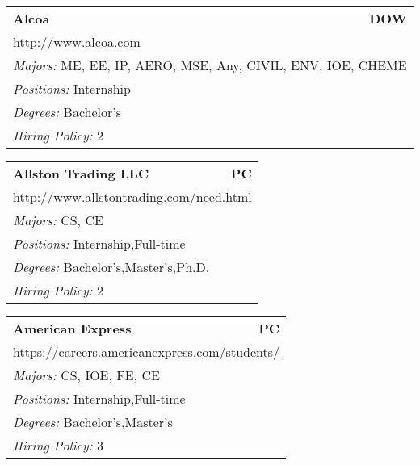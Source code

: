\documentclass[twoside]{article}
\begin{document}
\begin{center}
\begin{multicols}{3}
\begin{FlushLeft}
\begin{minipage}{.9\columnwidth}
\end{minipage}
 
\begin{minipage}{.9\columnwidth}\begin{tabularx}{.95\columnwidth}{Xr}
                 {\Large\bf Alcoa} & {\Large\bf DOW}\\
    \multicolumn{2}{p{.95\columnwidth}}{\url{http://www.alcoa.com}}\\
    \multicolumn{2}{p{.95\columnwidth}}{\emph{Majors:} ME, EE, IP, AERO, MSE, Any, CIVIL, ENV, IOE, CHEME}\\
    \multicolumn{2}{p{.95\columnwidth}}{\emph{Positions:} Internship}\\
    \multicolumn{2}{p{.95\columnwidth}}{\emph{Degrees:} Bachelor's}\\
    \multicolumn{2}{p{.95\columnwidth}}{\emph{Hiring Policy:} 2}\\
    \end{tabularx}
    
\end{minipage}
 
\begin{minipage}{.9\columnwidth}\begin{tabularx}{.95\columnwidth}{Xr}
                 {\Large\bf Allston Trading LLC} & {\Large\bf PC}\\
    \multicolumn{2}{p{.95\columnwidth}}{\url{http://www.allstontrading.com/need.html}}\\
    \multicolumn{2}{p{.95\columnwidth}}{\emph{Majors:} CS, CE}\\
    \multicolumn{2}{p{.95\columnwidth}}{\emph{Positions:} Internship,Full-time}\\
    \multicolumn{2}{p{.95\columnwidth}}{\emph{Degrees:} Bachelor's,Master's,Ph.D.}\\
    \multicolumn{2}{p{.95\columnwidth}}{\emph{Hiring Policy:} 2}\\
    \end{tabularx}
    
\end{minipage}
 
\begin{minipage}{.9\columnwidth}\begin{tabularx}{.95\columnwidth}{Xr}
                 {\Large\bf American Express} & {\Large\bf PC}\\
    \multicolumn{2}{p{.95\columnwidth}}{\url{https://careers.americanexpress.com/students/}}\\
    \multicolumn{2}{p{.95\columnwidth}}{\emph{Majors:} CS, IOE, FE, CE}\\
    \multicolumn{2}{p{.95\columnwidth}}{\emph{Positions:} Internship,Full-time}\\
    \multicolumn{2}{p{.95\columnwidth}}{\emph{Degrees:} Bachelor's,Master's}\\
    \multicolumn{2}{p{.95\columnwidth}}{\emph{Hiring Policy:} 3}\\
    \end{tabularx}
    

\end{minipage}
\end{FlushLeft}
\end{multicols}
\end{center}
\end{document}
